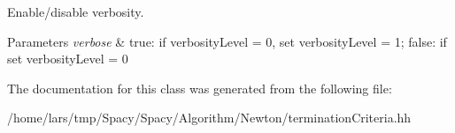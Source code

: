 Enable/disable verbosity. 


\begin{DoxyParams}{Parameters}
{\em verbose} & true\+: if verbosity\+Level = 0, set verbosity\+Level = 1; false\+: if set verbosity\+Level = 0 \\
\hline
\end{DoxyParams}


The documentation for this class was generated from the following file\+:\begin{DoxyCompactItemize}
\item 
/home/lars/tmp/\+Spacy/\+Spacy/\+Algorithm/\+Newton/termination\+Criteria.\+hh\end{DoxyCompactItemize}
